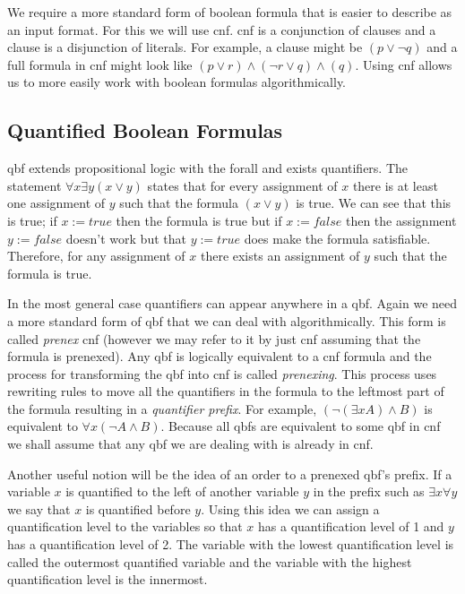 We require a more standard form of boolean formula that is easier to describe as an input format. For this we will use \gls{cnf}. \Gls{cnf} is a conjunction of clauses and a clause is a disjunction of literals. For example, a clause might be $(p \lor \neg q)$ and a full formula in \gls{cnf} might look like $(p \lor r) \land (\neg r \lor q) \land (q)$. Using \gls{cnf} allows us to more easily work with boolean formulas algorithmically.

\subsection{Quantified Boolean Formulas} \label{qbf}
\Gls{qbf} extends propositional logic with the \gls{forall} and \gls{exists} quantifiers. The statement $\forall x \exists y (x \lor y)$ states that for every assignment of $x$ there is at least one assignment of $y$ such that the formula $(x \lor y)$ is true. We can see that this is true; if $x := true$ then the formula is true but if $x := false$ then the assignment $y := false$ doesn't work but that $y := true$ does make the formula satisfiable. Therefore, for any assignment of $x$ there exists an assignment of $y$ such that the formula is true.

In the most general case quantifiers can appear anywhere in a \gls{qbf}. Again we need a more standard form of \gls{qbf} that we can deal with algorithmically. This form is called \textit{prenex} \gls{cnf} (however we may refer to it by just \gls{cnf} assuming that the formula is prenexed). Any \gls{qbf} is logically equivalent to a \gls{cnf} formula and the process for transforming the \gls{qbf} into \gls{cnf} is called \textit{prenexing}. This process uses rewriting rules to move all the quantifiers in the formula to the leftmost part of the formula resulting in a \textit{quantifier prefix}. For example, $(\neg (\exists x A) \land B)$ is equivalent to $\forall x (\neg A \land B)$. Because all \glspl{qbf} are equivalent to some \gls{qbf} in \gls{cnf} we shall assume that any \gls{qbf} we are dealing with is already in \gls{cnf}.

Another useful notion will be the idea of an order to a prenexed \gls{qbf}'s prefix. If a variable $x$ is quantified to the left of another variable $y$ in the prefix such as $\exists x \forall y$ we say that $x$ is quantified before $y$. Using this idea we can assign a quantification level to the variables so that $x$ has a quantification level of 1 and $y$ has a quantification level of 2. The variable with the lowest quantification level is called the outermost quantified variable and the variable with the highest quantification level is the innermost.

